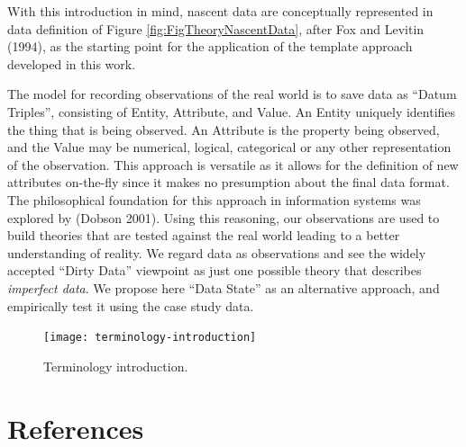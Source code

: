 \documentclass[smallextended]{svjour3}       %
\begin{document}
With this introduction in mind, nascent data are conceptually
represented in data definition of
Figure \ref{fig:FigTheoryNascentData}, after Fox and Levitin (1994), as the starting
point for the application of the template approach developed in this
work.

The model for recording observations of the real world is to save data
as ``Datum Triples'', consisting of Entity, Attribute, and Value. An
Entity uniquely identifies the thing that is being observed. An
Attribute is the property being observed, and the Value may be
numerical, logical, categorical or any other representation of the
observation. This approach is versatile as it allows for the definition
of new attributes on-the-fly since it makes no presumption about the
final data format. The philosophical foundation for this approach in
information systems was explored by (Dobson 2001). Using this reasoning,
our observations are used to build theories that are tested against the
real world leading to a better understanding of reality. We regard data
as observations and see the widely accepted ``Dirty Data'' viewpoint as
just one possible theory that describes \emph{imperfect data}. We propose
here ``Data State'' as an alternative approach, and empirically test it
using the case study data.

\begin{figure}

{\centering \texttt{[image: terminology-introduction]} 

}

\caption{Terminology introduction.}\label{fig:TerminologyIntroduction}
\end{figure}

\hypertarget{references}{%
\section*{References}\label{references}}
\end{document}
